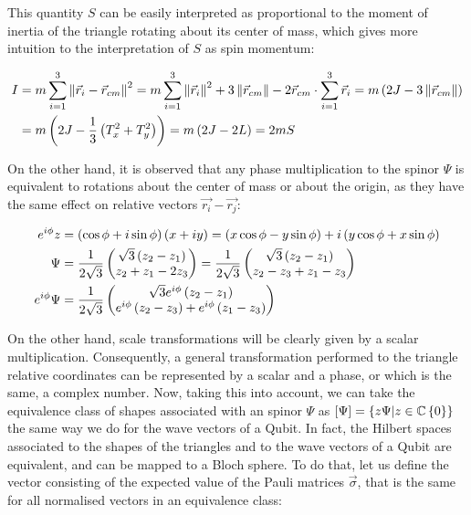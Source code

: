 This quantity $S$ can be easily interpreted as proportional to the moment of inertia of the triangle rotating about its center of mass, which gives more intuition to the interpretation of $S$ as spin momentum:

\begin{align*}
I &= m\sum_{i=1}^3 \left\lVert \vec{r}_i - \vec{r}_{cm} \right\rVert^2 = m\sum_{i=1}^3 \left\lVert \vec{r}_i \right\rVert^2 + 3\left\lVert \vec{r}_{cm} \right\rVert - 2\vec{r}_{cm}\cdot\sum_{i=1}^3\vec{r}_i =m\left( 2J -3\left\lVert \vec{r}_{cm} \right\rVert \right)\\
&= m\left( 2J - \frac{1}{3}\left( T_x^2+T_y^2 \right) \right) = m\left( 2J-2L \right) = 2mS
\end{align*}

On the other hand, it is observed that any phase multiplication to the spinor $\Psi$ is equivalent to rotations about the center of mass or about the origin, as they have the same effect on relative vectors $\vec{r_i}-\vec{r_j}$:

\begin{align*}
e^{i\phi}z &= \left( \cos{\phi}+i\sin{\phi} \right)\left( x+iy \right) = \left( x\cos{\phi}-y\sin{\phi} \right) + i\left( y\cos{\phi}+x\sin{\phi} \right)\\
\Psi &= \frac{1}{2\sqrt{3}}\begin{pmatrix}\sqrt{3}\left( z_{2}-z_{1} \right)\\
z_{2}+z_{1}-2z_{3}\end{pmatrix}=\frac{1}{2\sqrt{3}}\begin{pmatrix}\sqrt{3}\left( z_{2}-z_{1} \right)\\
z_{2}-z_3+ z_{1}-z_{3}\end{pmatrix}\\
e^{i\phi}\Psi &= \frac{1}{2\sqrt{3}}\begin{pmatrix}\sqrt{3}e^{i\phi}\left( z_{2}-z_{1} \right)\\
e^{i\phi}\left( z_{2}-z_3 \right)+ e^{i\phi}\left( z_{1}-z_{3} \right)\end{pmatrix}
\end{align*}

On the other hand, scale transformations will be clearly given by a scalar multiplication. Consequently, a general transformation performed to the triangle relative coordinates can be represented by a scalar and a phase, or which is the same, a complex number. Now, taking this into account, we can take the equivalence class of shapes associated with an spinor $\Psi$ as $\left[ \Psi \right] = \left\{ z\Psi | z \in \mathbb{C} \\ \left\{ 0 \right\} \right\}$ the same way we do for the wave vectors of a Qubit. In fact, the Hilbert spaces associated to the shapes of the triangles and to the wave vectors of a Qubit are equivalent, and can be mapped to a Bloch sphere. To do that, let us define the vector consisting of the expected value of the Pauli matrices $\vec{\sigma}$, that is the same for all normalised vectors in an equivalence class:

